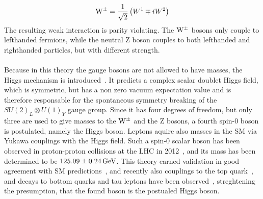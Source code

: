 \begin{equation}
  \mathrm{W}^\pm = \frac{1}{\sqrt{2}}\left(W^1\mp i W^2\right)
\end{equation}
The resulting weak interaction is parity violating. The $\mathrm{W}^\pm$ bosons only couple to lefthanded fermions, while the neutral Z boson couples to both lefthanded and righthanded particles, but with different strength.\\
\\Because in this theory the gauge bosons are not allowed to have masses, the Higgs mechanism is introduced~\cite{Higgs1,Higgs2,Higgs3}. It predicts a complex scalar doublet Higgs field, which is symmetric, but has a non zero vacuum expectation value and is therefore responsable for the spontaneous symmetry breaking of the $ SU(2)_L\otimes U(1)_Y$ gauge group. Since it has four degrees of freedom, but only three are used to give masses to the $\mathrm{W}^\pm$ and the Z bosons, a fourth spin-0 boson is postulated, namely the Higgs boson. Leptons aquire also masses in the SM via Yukawa couplings with the Higgs field.
Such a spin-0 scalar boson has been observed in proton-proton collisions at the LHC in 2012~\cite{HiggsCMS,HiggsATLAS}, and its mass has been determined to be $125.09\pm0.24\,\text{Ge\hspace{-.08em}V}$. This theory earned validation in good agreement with SM predictions~\cite{HiggsPrecise}, and recently also couplings to the top quark~\cite{ttH}, and decays to bottom quarks and tau leptons have been observed~\cite{HiggsTauTau,HiggsBB}, streghtening the presumption, that the found boson is the postualed Higgs boson.




